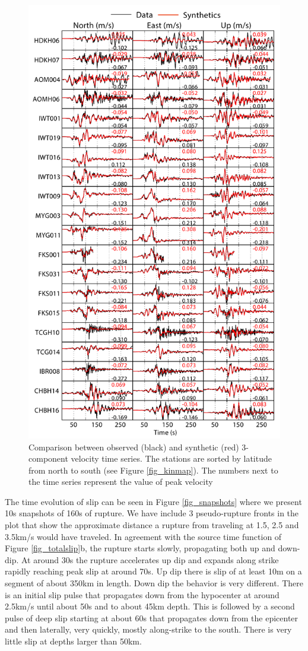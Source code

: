 \begin{figure}[!ht] 
  \centering
  \includegraphics[width=0.72\linewidth]{./figures/ch4/vel_data_vs_synthetics}
    \caption[Data fits No. 2 for the kinematic inversion]{Comparison between observed (black) and synthetic (red) 3-component velocity time series. The stations are sorted by latitude from north to south (see Figure \ref{fig_kinmap}). The numbers next to the time series represent the value of peak velocity}
  \label{fig_velfits}
\end{figure}

The time evolution of slip can be seen in Figure \ref{fig_snapshots} where we present 10s snapshots of 160s of rupture. We have include 3 pseudo-rupture fronts in the plot that show the approximate distance a rupture from traveling at 1.5, 2.5 and 3.5km/s would have traveled. In agreement with the source time function of Figure \ref{fig_totalslip}b, the rupture starts slowly, propagating both up and down-dip. At around 30s the rupture accelerates up dip and expands along strike rapidly reaching peak slip at around 70s. Up dip there is slip of at least 10m on a segment of about 350km in length. Down dip the behavior is very different. There is an initial slip pulse that propagates down from the hypocenter at around 2.5km/s until about 50s and to about 45km depth. This is followed by a second pulse of deep slip starting at about 60s that propagates down from the epicenter and then laterally, very quickly, mostly along-strike to the south. There is very little slip at depths larger than 50km.

